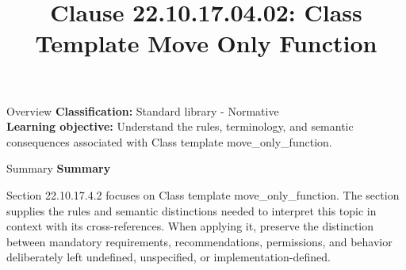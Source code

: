 \documentclass[10pt,letterpaper]{article}
\title{Clause 22.10.17.04.02: Class Template Move Only Function}
\author{}
\date{}
\begin{document}
\maketitle
\begin{CornellOverviewBox}{Overview}
\textbf{Classification:} Standard library - Normative\\[2pt]
\textbf{Learning objective:} Understand the rules, terminology, and semantic consequences associated with Class template move\_only\_function.
\end{CornellOverviewBox}\begin{CornellSummaryBox}{Summary}
{\sffamily\bfseries\color{Accent} Summary}\par\vspace{3pt}Section 22.10.17.4.2 focuses on Class template move\_only\_function. The section supplies the rules and semantic distinctions needed to interpret this topic in context with its cross-references. When applying it, preserve the distinction between mandatory requirements, recommendations, permissions, and behavior deliberately left undefined, unspecified, or implementation-defined.
\end{CornellSummaryBox}
\end{document}
